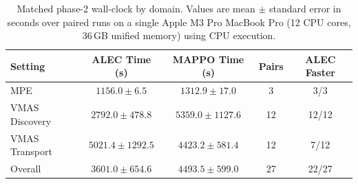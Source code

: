 \begin{table}[t]
\centering
\caption{Partial-observation MPE simple\_spread scaling ablation. Values are mean $\pm$ standard error over seeds; lower mean\_dist is better. The final column reports seeds as baseline / memory-only / memory+communication. The memory+communication row at $N=8$ uses 3 seeds; all other entries use 6.}
\label{tab:mpe_memory_scaling_ablation}
\end{table}

\begin{table}[t]
\centering
\caption{Matched phase-2 wall-clock by domain. Values are mean $\pm$ standard error in seconds over paired runs on a single Apple M3 Pro MacBook Pro (12 CPU cores, 36\,GB unified memory) using CPU execution.}
\label{tab:phase2_wallclock_ablation}
\begin{tabular}{lcccc}
\toprule
Setting & ALEC Time (s) & MAPPO Time (s) & Pairs & ALEC Faster \\
\midrule
MPE & $1156.0 \pm 6.5$ & $1312.9 \pm 17.0$ & 3 & 3/3 \\
VMAS Discovery & $2792.0 \pm 478.8$ & $5359.0 \pm 1127.6$ & 12 & 12/12 \\
VMAS Transport & $5021.4 \pm 1292.5$ & $4423.2 \pm 581.4$ & 12 & 7/12 \\
Overall & $3601.0 \pm 654.6$ & $4493.5 \pm 599.0$ & 27 & 22/27 \\
\bottomrule
\end{tabular}
\end{table}

